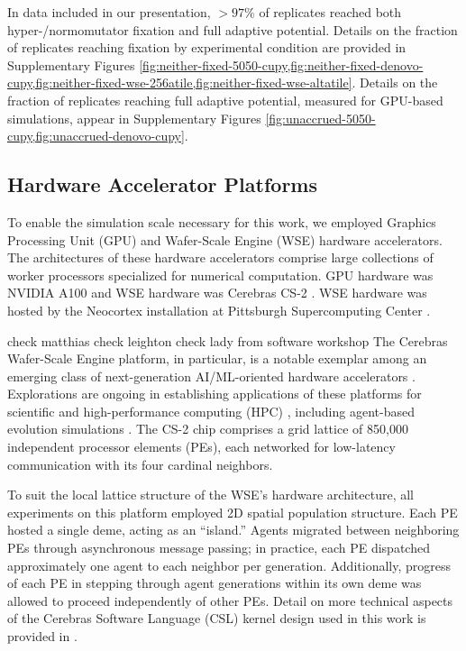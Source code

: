 In data included in our presentation, $>97\%$ of replicates reached both hyper-/normomutator fixation and full adaptive potential.
Details on the fraction of replicates reaching fixation by experimental condition are provided in Supplementary Figures \cref{fig:neither-fixed-5050-cupy,fig:neither-fixed-denovo-cupy,fig:neither-fixed-wse-256atile,fig:neither-fixed-wse-altatile}.
Details on the fraction of replicates reaching full adaptive potential, measured for GPU-based simulations, appear in Supplementary Figures \cref{fig:unaccrued-5050-cupy,fig:unaccrued-denovo-cupy}.

\subsection{Hardware Accelerator Platforms} \label{sec:hardware}

To enable the simulation scale necessary for this work, we employed Graphics Processing Unit (GPU) and Wafer-Scale Engine (WSE) hardware accelerators.
The architectures of these hardware accelerators comprise large collections of worker processors specialized for numerical computation.
GPU hardware was NVIDIA A100 and WSE hardware was Cerebras CS-2 \citep{choquette2021nvidia,cerebras2021wafer}.
WSE hardware was hosted by the Neocortex installation at Pittsburgh Supercomputing Center \citep{buitrago2021neocortex}.

check matthias
check leighton
check lady from software workshop
The Cerebras Wafer-Scale Engine platform, in particular, is a notable exemplar among an emerging class of next-generation AI/ML-oriented hardware accelerators \citep{lauterbach2021path}.
Explorations are ongoing in establishing applications of these platforms for scientific and high-performance computing (HPC) \citep{rocki2020fast,brown2023exploring,ltaief2023scaling,sai2023massively,brown2022distributed,luow2020using,woo2022distributed,tramm2024efficient,chen2024using,phillips2023solving,chen2024solving}, including agent-based evolution simulations \citep{moreno2024trackable}.
The CS-2 chip comprises a grid lattice of 850,000 independent processor elements (PEs), each networked for low-latency communication with its four cardinal neighbors.

To suit the local lattice structure of the WSE's hardware architecture, all experiments on this platform employed 2D spatial population structure.
Each PE hosted a single deme, acting as an ``island.''
Agents migrated between neighboring PEs through asynchronous message passing;
in practice, each PE dispatched approximately one agent to each neighbor per generation.
Additionally, progress of each PE in stepping through agent generations within its own deme was allowed to proceed independently of other PEs.
Detail on more technical aspects of the Cerebras Software Language (CSL) kernel design used in this work is provided in \citet{moreno2024trackable}.

